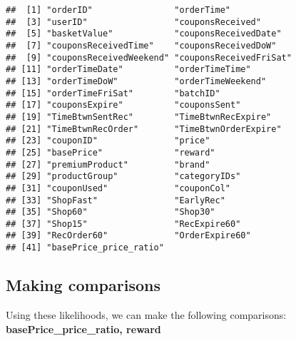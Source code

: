 \documentclass[10pt]{report}
\newenvironment{Shaded}{}{}
\newcommand{\KeywordTok}[1]{\textcolor[rgb]{0.00,0.44,0.13}{\textbf{{#1}}}}
\newcommand{\DataTypeTok}[1]{\textcolor[rgb]{0.56,0.13,0.00}{{#1}}}
\newcommand{\StringTok}[1]{\textcolor[rgb]{0.25,0.44,0.63}{{#1}}}
\newcommand{\CommentTok}[1]{\textcolor[rgb]{0.38,0.63,0.69}{\textit{{#1}}}}
\newcommand{\NormalTok}[1]{{#1}}
\begin{document}
\begin{verbatim}
##  [1] "orderID"                "orderTime"             
##  [3] "userID"                 "couponsReceived"       
##  [5] "basketValue"            "couponsReceivedDate"   
##  [7] "couponsReceivedTime"    "couponsReceivedDoW"    
##  [9] "couponsReceivedWeekend" "couponsReceivedFriSat" 
## [11] "orderTimeDate"          "orderTimeTime"         
## [13] "orderTimeDoW"           "orderTimeWeekend"      
## [15] "orderTimeFriSat"        "batchID"               
## [17] "couponsExpire"          "couponsSent"           
## [19] "TimeBtwnSentRec"        "TimeBtwnRecExpire"     
## [21] "TimeBtwnRecOrder"       "TimeBtwnOrderExpire"   
## [23] "couponID"               "price"                 
## [25] "basePrice"              "reward"                
## [27] "premiumProduct"         "brand"                 
## [29] "productGroup"           "categoryIDs"           
## [31] "couponUsed"             "couponCol"             
## [33] "ShopFast"               "EarlyRec"              
## [35] "Shop60"                 "Shop30"                
## [37] "Shop15"                 "RecExpire60"           
## [39] "RecOrder60"             "OrderExpire60"         
## [41] "basePrice_price_ratio"
\end{verbatim}

\subsection{Making comparisons}\label{making-comparisons}

Using these likelihoods, we can make the following comparisons:
\textbf{basePrice\_price\_ratio, reward}

\begin{Shaded}
\end{Shaded}
\end{document}
